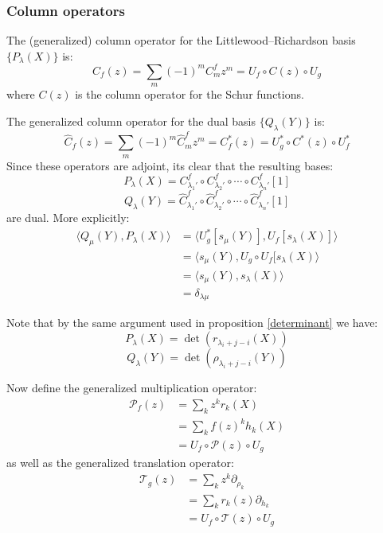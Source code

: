 \documentclass[12pt,dvips]{amsart}
\begin{document}
\subsubsection{Column operators}
The (generalized) column operator for the Littlewood--Richardson basis $\{P_\lambda(X)\}$ is:
$$ C_f(z) = \sum_m (-1)^m C^f_m z^m = U_f \circ C(z) \circ U_g$$
where $C(z)$ is the column operator for the Schur functions.
\par\bigskip
The generalized column operator for the dual basis $\{Q_\lambda(Y)\}$ is:
$$ \hat{C}_f(z) = \sum_m (-1)^m \hat{C}^f_m z^m = {C}_f^*(z) = U_g^* \circ C^*(z) \circ U_f^*$$
Since these operators are adjoint, its clear that the resulting bases:
$$ P_\lambda(X) = {C}^f_{\lambda_1'} \circ {C}^f_{\lambda_2'} \circ \cdots \circ {C}^f_{\lambda_n'}[1]$$
$$ Q_\lambda(Y) = \hat{C}^f_{\lambda_1'} \circ \hat{C}^f_{\lambda_2'} \circ  \cdots \circ \hat{C}^f_{\lambda_n'}[1]$$
are dual. More explicitly:
\begin{align*}
\langle Q_\mu(Y), P_\lambda(X) \rangle & =  \langle U^*_g[s_\mu(Y)], U_f[s_\lambda(X)] \rangle \\
& =  \langle s_\mu(Y), U_g \circ U_f[s_\lambda(X) \rangle \\
& =  \langle s_\mu(Y), s_\lambda(X) \rangle \\
& =  \delta_{\lambda \mu}
\end{align*}

\par\bigskip
Note that by the same argument used in proposition \ref{determinant} we have:
$$ P_\lambda(X) = \det(r_{\lambda_i + j - i}(X))$$
$$ Q_\lambda(Y) = \det(\rho_{\lambda_i + j - i}(Y))$$

\noindent
Now define the generalized multiplication operator:
\begin{align*}
\mathcal{P}_{f}(z) & =  \sum_k z^k r_k(X) \\
& =  \sum_k f(z)^k h_k(X) \\
& =  U_f \circ \mathcal{P}(z) \circ U_g 
\end{align*}
as well as the generalized translation operator:
\begin{align*}
\mathcal{T}_{g}(z) & =  \sum_k z^k \partial_{\rho_k} \\
& =  \sum_k r_k(z) \partial_{h_k} \\
& =  U_f \circ \mathcal{T}(z) \circ U_g
\end{align*}
\end{document}
